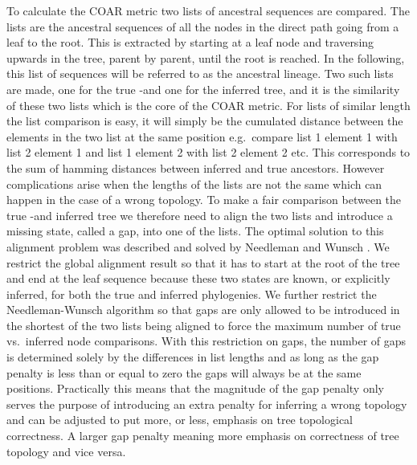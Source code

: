 To calculate the COAR metric two lists of ancestral sequences are compared.
The lists are the ancestral sequences of all the nodes in the direct path going from a leaf to the root.
This is extracted by starting at a leaf node and traversing upwards in the tree, parent by parent, until the root is reached.
In the following, this list of sequences will be referred to as the ancestral lineage.
Two such lists are made, one for the true -and one for the inferred tree, and it is the similarity of these two lists which is the core of the COAR metric.
For lists of similar length the list comparison is easy, it will simply be the cumulated distance between the elements in the two list at the same position e.g.\ compare list 1 element 1 with list 2 element 1 and list 1 element 2 with list 2 element 2 etc.
This corresponds to the sum of hamming distances between inferred and true ancestors.
However complications arise when the lengths of the lists are not the same which can happen in the case of a wrong topology.
To make a fair comparison between the true -and inferred tree we therefore need to align the two lists and introduce a missing state, called a gap, into one of the lists.
The optimal solution to this alignment problem was described and solved by Needleman and Wunsch \cite{needleman1970general}.
We restrict the global alignment result so that it has to start at the root of the tree and end at the leaf sequence because these two states are known, or explicitly inferred, for both the true and inferred phylogenies.
We further restrict the Needleman-Wunsch algorithm so that gaps are only allowed to be introduced in the shortest of the two lists being aligned to force the maximum number of true vs.\ inferred node comparisons.
With this restriction on gaps, the number of gaps is determined solely by the differences in list lengths and as long as the gap penalty is less than or equal to zero the gaps will always be at the same positions.
Practically this means that the magnitude of the gap penalty only serves the purpose of introducing an extra penalty for inferring a wrong topology and can be adjusted to put more, or less, emphasis on tree topological correctness.
A larger gap penalty meaning more emphasis on correctness of tree topology and vice versa.

